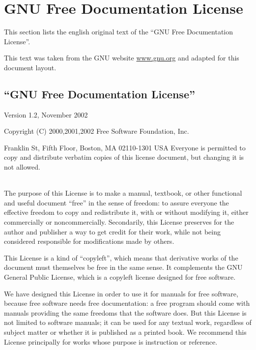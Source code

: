 
\section{GNU Free Documentation License}


This section lists the english original text of the "`GNU Free Documentation License"'.

This text was taken from the GNU website \url{www.gnu.org} and adapted for this document layout.


\subsection{``GNU Free Documentation License''}

\noindent
Version 1.2, November 2002

\noindent
Copyright (C) 2000,2001,2002  Free Software Foundation, Inc.
 
 Franklin St, Fifth Floor, Boston, MA  02110-1301  USA Everyone is permitted to copy and distribute verbatim copies of this license document, but changing it is not allowed.

\bigskip{}\\

\noindent
The purpose of this License is to make a manual, textbook, or other functional and useful document "`free"' in the sense of freedom: to assure everyone the effective freedom to copy and redistribute it,
with or without modifying it, either commercially or noncommercially. Secondarily, this License preserves for the author and publisher a way to get credit for their work, while not being considered responsible for modifications made by others.

This License is a kind of "`copyleft"', which means that derivative works of the document must themselves be free in the same sense. It complements the GNU General Public License, which is a copyleft license designed for free software.

We have designed this License in order to use it for manuals for free software, because free software needs free documentation: a free program should come with manuals providing the same freedoms that the software does.  But this License is not limited to software manuals; it can be used for any textual work, regardless of subject matter or whether it is published as a printed book. We recommend this License principally for works whose purpose is instruction or reference.


